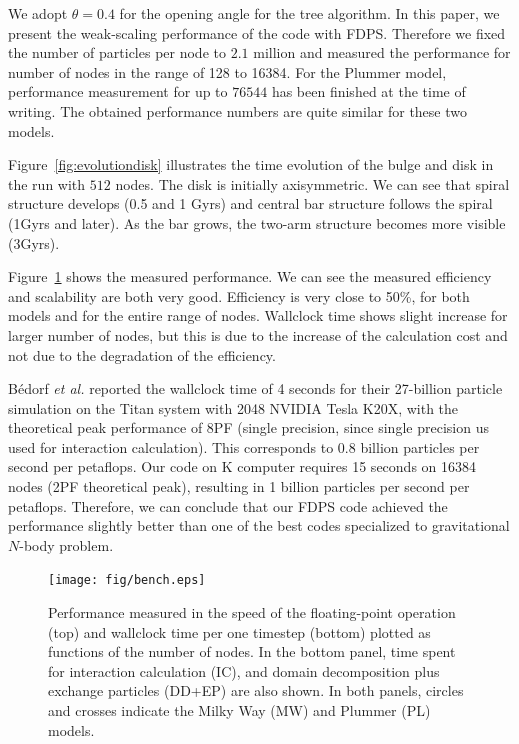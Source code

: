 We adopt $\theta=0.4$ for the opening angle for the tree algorithm. In
this paper, we present the weak-scaling performance of the code with
FDPS. Therefore we fixed the number of particles per node to $2.1$
million and measured the performance for number of nodes in the range
of 128 to 16384.  For the Plummer model, performance measurement for up
to $76544$ has been finished at the time of writing. The obtained
performance numbers are quite similar for these two models.

Figure~\ref{fig:evolutiondisk} illustrates the time evolution of the
bulge and disk in the run with $512$ nodes. The disk is initially
axisymmetric.  We can see that spiral structure develops (0.5 and 1
Gyrs) and central bar structure follows the spiral (1Gyrs and
later). As the bar grows, the two-arm structure becomes more visible
(3Gyrs).

Figure~\ref{fig:benchdisk} shows the measured performance. We can see
the measured efficiency and scalability are both very good. Efficiency
is very close to 50\%, for both models and for the entire range of
nodes. Wallclock time shows slight  increase for larger number of nodes,
but this is due to the increase of the calculation cost and not due to
the degradation of the efficiency. 

B\'edorf \textit{et al.}\cite{Bedorf:2014:PGT:2683593.2683600}
reported the wallclock time of 4 seconds for their 27-billion particle
simulation on the Titan system with 2048 NVIDIA Tesla K20X, with the
theoretical peak performance of 8PF (single precision, since single
precision us used for interaction calculation). This corresponds to
0.8 billion particles per second per petaflops. Our code on K computer
requires 15 seconds on 16384 nodes (2PF theoretical peak), resulting in
1 billion particles per second per petaflops. Therefore, we can
conclude that our FDPS code achieved the performance slightly better
than one of the best codes specialized to gravitational $N$-body
problem.

\begin{figure}
  \begin{center}
    \texttt{[image: fig/bench.eps]}
  \end{center}
  \caption{Performance measured in the speed of the floating-point
    operation (top) and wallclock time per one timestep (bottom)
    plotted as functions of the number of nodes. In the bottom panel,
    time spent for interaction calculation (IC), and domain
    decomposition plus exchange particles (DD+EP) are also shown.  In
    both panels, circles and crosses indicate the Milky Way (MW)
    and Plummer (PL) models.
    }
  \label{fig:benchdisk}
\end{figure}


